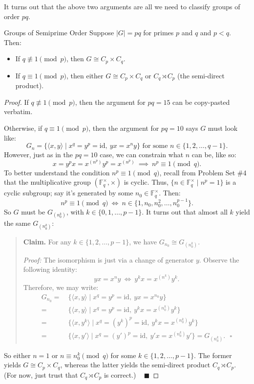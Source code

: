 It turns out that the above two arguments are all we need to classify groups of order $pq$.

\begin{theorem}{Groups of Semiprime Order}
    Suppose $|G| = pq$ for primes $p$ and $q$ and $p < q$.  Then:
    \begin{itemize}
        \item If $q \not \equiv 1 \pmod{p}$, then $G \cong C_p \times C_q$.
        \item If $q \equiv 1 \pmod{p}$, then either $G \cong C_p \times C_q$ or $C_q \rtimes C_p$ (the semi-direct product).
    \end{itemize}
\end{theorem}

\begin{proof}
    If $q \not \equiv 1 \pmod{p}$, then the argument for $pq = 15$ can be copy-pasted verbatim.

    Otherwise, if $q \equiv 1 \pmod{p}$, then the argument for $pq = 10$ says $G$ must look like:
    \[ G_n = \{ \langle x, y \rangle \mid x^q = y^p = \mathrm{id}, ~ yx = x^ny\} \text{ for some } n \in \{1,2, \dots, q - 1\}. \]
    However, just as in the $pq = 10$ case, we can constrain what $n$ can be, like so:
    \[ x = y^px = x^{(n^p)}y^p = x^{(n^p)} ~ \implies ~ n^p \equiv 1 \pmod{q}. \]
    To better understand the condition $n^p \equiv 1 \pmod{q}$, recall from Problem Set \#4 that the multiplicative group $(\mathbb{F}_q^{\times}, \times)$ is cyclic.  Thus, $\{n \in \mathbb{F}_q^{\times} \mid n^p = 1\}$ is a cyclic subgroup; say it's generated by some $n_0 \in \mathbb{F}_q^{\times}$.  Then:
    \[ n^p \equiv 1 \pmod{q} ~ \iff ~ n \in \{1, n_0, n_0^2, \dots, n_0^{p - 1}\}. \]
    So $G$ must be $G_{(n_0^k)}$, with $k \in \{0, 1, \dots, p - 1\}$.  It turns out that almost all $k$ yield the same $G_{(n_0^k)}$:
    \begin{quote}
        \textbf{Claim.} For any $k \in \{1, 2, \dots, p - 1\}$, we have $G_{n_0} \cong G_{(n_0^k)}$.

        \emph{Proof:} The isomorphism is just via a change of generator $y$.  Observe the following identity:
        \[ yx = x^n y ~ \iff ~ y^kx = x^{(n^k)}y^k. \]
        Therefore, we may write:
        \begin{align*} G_{n_0} = \ &  \{ \langle x, y \rangle \mid x^q = y^p = \mathrm{id}, \ yx = x^{n_0}y \} \\
        = \ & \{ \langle x, y \rangle \mid x^q = y^p = \mathrm{id}, \ y^k x = x^{(n_0^k)}y^k \} \\
        = \ & \{ \langle x, y^k \rangle \mid x^q = (y^k)^p = \mathrm{id}, \ y^kx = x^{(n_0^k)}y^k \} \\
        = \ & \{ \langle x, y' \rangle \mid x^q = (y')^p = \mathrm{id}, \ y'x = x^{(n_0^k)}y' \} = G_{(n_0^k)}. ~~~ \square \end{align*}
    \end{quote}
    So either $n = 1$ or $n \equiv n_0^k \pmod{q}$ for some $k \in \{1, 2, \dots, p - 1\}$.  The former yields $G \cong C_p \times C_q$, whereas the latter yields the semi-direct product $C_q \rtimes C_p$.  (For now, just trust that $C_q \rtimes C_p$ is correct.) ~ $\blacksquare$
\end{proof}

